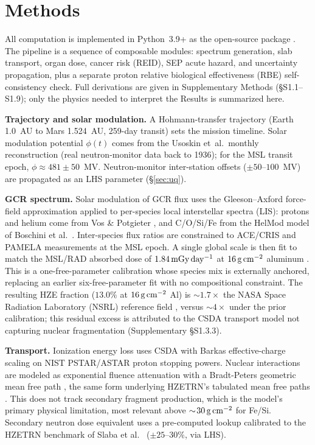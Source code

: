 
\section{Methods}
\label{sec:methods}

All computation is implemented in Python~3.9+ as the open-source package
. The pipeline is a
sequence of composable modules: spectrum generation, slab transport, organ
dose, cancer risk (REID), SEP acute hazard, and uncertainty propagation, plus
a separate proton relative biological effectiveness (RBE) self-consistency
check. Full derivations are given in Supplementary Methods
(\S{}S1.1--S1.9); only the physics needed to interpret the Results is
summarized here.

\textbf{Trajectory and solar modulation.}
\label{sec:phi}
A Hohmann-transfer trajectory
(Earth 1.0~AU to Mars 1.524~AU, 259-day transit) sets the mission timeline.
Solar modulation potential $\phi(t)$ comes from the Usoskin et~al.\ monthly
reconstruction (real neutron-monitor data back to 1936); for the MSL transit
epoch, $\phi \approx 481\pm50$~MV. Neutron-monitor inter-station offsets
($\pm50$--$100$~MV) are propagated as an LHS parameter (\S\ref{sec:uq}).

\textbf{GCR spectrum.}
\label{sec:calib}
Solar modulation of GCR flux uses the Gleeson--Axford force-field
approximation applied to per-species local interstellar spectra (LIS):
protons and helium come from Vos \& Potgieter \cite{vos2015}, and C/O/Si/Fe from
the HelMod model of Boschini et al.\ \cite{boschini2020}. Inter-species
flux ratios are constrained to ACE/CRIS \citep{george2009} and PAMELA
\citep{adriani2014} measurements at the MSL epoch. A single global scale
is then fit to match the MSL/RAD absorbed dose of $1.84\,\mathrm{mGy\,day^{-1}}$ at
$16\,\mathrm{g\,cm^{-2}}$ aluminum \citep{zeitlin2013}. This is a one-free-parameter calibration
whose species mix is externally anchored, replacing an earlier
six-free-parameter fit with no compositional constraint. The resulting
HZE fraction ($13.0\%$ at $16\,\mathrm{g\,cm^{-2}}$ Al) is $\sim\!1.7\times$ the NASA Space
Radiation Laboratory (NSRL) reference field \citep{slaba2016}, versus
$\sim\!4\times$ under the prior
calibration; this residual excess is attributed to the CSDA transport
model not capturing nuclear fragmentation (Supplementary \S{}S1.3.3).

\textbf{Transport.} Ionization energy loss uses CSDA with Barkas
effective-charge scaling on NIST
PSTAR/ASTAR proton stopping powers. Nuclear interactions are modeled as
exponential fluence attenuation with a Bradt-Peters geometric mean free path
\citep{bradtpeters1950}, the same form underlying HZETRN's tabulated mean
free paths \citep{wilson1991}. This does not track secondary fragment
production, which is the model's primary physical limitation, most relevant
above $\sim\!30\,\mathrm{g\,cm^{-2}}$ for Fe/Si. Secondary neutron dose equivalent uses a
pre-computed lookup calibrated to the HZETRN benchmark of Slaba et al.\
\cite{slaba2014} ($\pm25$--$30\%$, via LHS).

